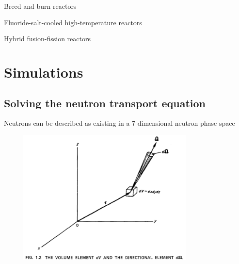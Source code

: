 \documentclass{beamer}
\begin{document}
    \begin{frame}{Breed and burn reactors}
    \end{frame}

    \begin{frame}{Fluoride-salt-cooled high-temperature reactors}
    \end{frame}

    \begin{frame}{Hybrid fusion-fission reactors}
    \end{frame}

\section{Simulations}

\subsection{Solving the neutron transport equation}

    \begin{frame}{Neutrons can be described as existing in a 7-dimensional neutron phase space}
        \begin{figure}
            \centering
            \includegraphics[width=24em]{./img/phaseSpace.png}
        \end{figure}
    \end{frame}
\end{document}
